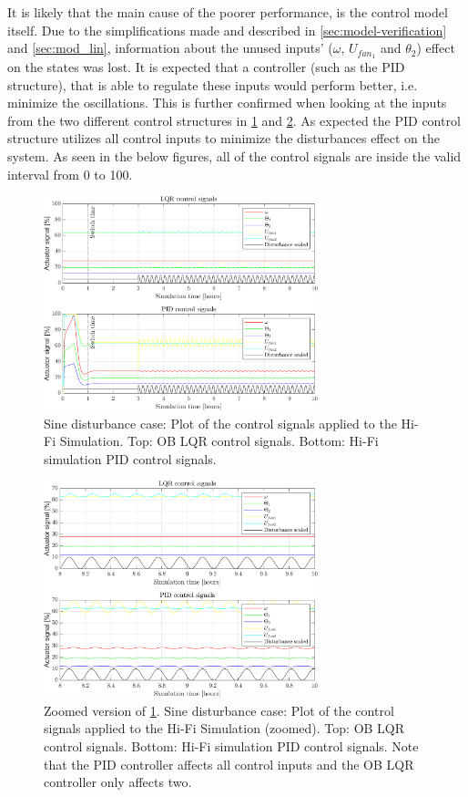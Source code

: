 It is likely that the main cause of the poorer performance, is the control model itself. Due to the simplifications made and described in \cref{sec:model-verification} and \cref{sec:mod_lin}, information about the unused inputs' ($\omega$, $U_{fan_1}$ and $\theta_2$) effect on the states was lost. It is expected that a controller (such as the PID structure), that is able to regulate these inputs would perform better, i.e. minimize the oscillations. This is further confirmed when looking at the inputs from the two different control structures in \cref{fig:inputs_sineDist} and \cref{fig:inputs_sineDist_zoom}. As expected the PID control structure utilizes all control inputs to minimize the disturbances effect on the system. As seen in the below figures, all of the control signals are inside the valid interval from 0 to 100.\\

\begin{figure}[H]
	\centering
	\includegraphics[width=0.71\textwidth]{Graphics/fig_inputs_sineDist.png}
	\caption{Sine disturbance case: Plot of the control signals applied to the Hi-Fi Simulation. Top: OB LQR control signals. Bottom: Hi-Fi simulation PID control signals.}
	\label{fig:inputs_sineDist}
\end{figure}

\begin{figure}[H]
	\centering
	\includegraphics[width=0.71\textwidth]{Graphics/fig_inputs_sineDist_zoom.png}
	\caption{Zoomed version of \cref{fig:inputs_sineDist}. Sine disturbance case: Plot of the control signals applied to the Hi-Fi Simulation (zoomed). Top: OB LQR control signals. Bottom: Hi-Fi simulation PID control signals. Note that the PID controller affects all control inputs and the OB LQR controller only affects two.}
	\label{fig:inputs_sineDist_zoom}
\end{figure}

